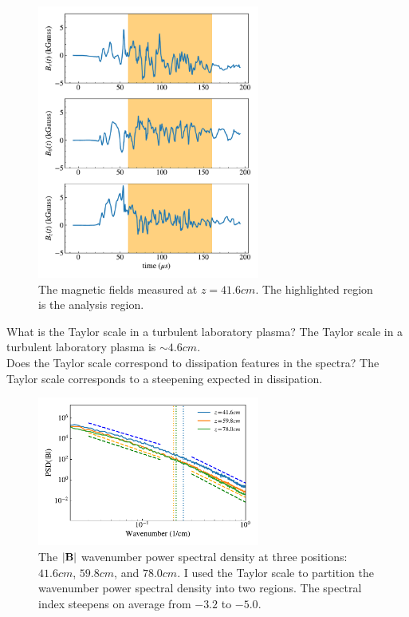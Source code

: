 \documentclass[%
 aip,
 amsmath,amssymb,
preprint,%
]{revtex4-1}
\begin{document}
\begin{figure}
\includegraphics[width=0.65\textwidth]{Figures/fields/bfields_time_num20.pdf}%
\caption{\label{fig:wave_psd} The magnetic fields measured at $z = 41.6cm$. The highlighted region is the analysis region.}
\end{figure}

What is the Taylor scale in a turbulent laboratory plasma?
The Taylor scale in a turbulent laboratory plasma is $\sim4.6cm$.\\

Does the Taylor scale correspond to dissipation features in the spectra?
The Taylor scale corresponds to a steepening expected in dissipation.
\begin{figure}
\includegraphics[width=0.65\textwidth]{Figures/psd/pwr_den_k_interp_all_window_lmfit.pdf}%
\caption{\label{fig:wave_psd} The $|\vb{B}|$ wavenumber power spectral density at three positions: $41.6cm$, $59.8cm$, and $78.0cm$. I used the Taylor scale to partition the wavenumber power spectral density into two regions. The spectral index steepens on average from $-3.2$ to $-5.0$.}
\end{figure}
\\
\end{document}
